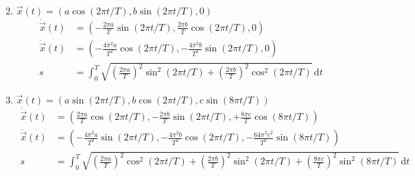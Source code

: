 \documentclass[11pt,answers]{exam}
\begin{document}
\begin{questions}
\begin{solution}
\begin{enumerate}
\begin{align*}
\end{align*}
\item $\vec{x}(t)=(a\cos(2\pi t/T),b\sin(2\pi t/T),0)$
\begin{align*}
\dot{\vec{x}}(t)&=\left(-\frac{2\pi a}{T}\sin(2\pi t/T),
\frac{2\pi b}{T}\cos(2\pi t/T),0\right)
\\
\ddot{\vec{x}}(t)&=\left(-\frac{4\pi^2 a}{T^2}\cos(2\pi t/T),
-\frac{4\pi^2 b}{T^2}\sin(2\pi t/T),0\right)
\\
s&=\int_0^T\sqrt{\left(\frac{2\pi a}{T}\right)^2\sin^2(2\pi t/T)+
\left(\frac{2\pi b}{T}\right)^2\cos^2(2\pi t/T)}\,\mathrm dt
\end{align*}
\item $\vec{x}(t)=(a\sin(2\pi t/T),b\cos(2\pi t/T),c\sin(8\pi t/T))$
\begin{align*}
\dot{\vec{x}}(t)&=\left(\frac{2\pi a}{T}\cos(2\pi t/T),
-\frac{2\pi b}{T}\sin(2\pi t/T),+\frac{8\pi c}{T}\cos(8\pi t/T)\right)
\\
\ddot{\vec{x}}(t)&=\left(-\frac{4\pi^2 a}{T^2}\sin(2\pi t/T),
-\frac{4\pi^2 b}{T^2}\cos(2\pi t/T),-\frac{64\pi^2 c^2}{T^2}\sin(8\pi t/T)\right)
\\
s&=\int_0^T\sqrt{\left(\frac{2\pi a}{T}\right)^2\cos^2(2\pi t/T)+
\left(\frac{2\pi b}{T}\right)^2\sin^2(2\pi t/T)+\left(\frac{8\pi c}{T}\right)^2\sin^2(8\pi t/T)}\,\mathrm dt
\end{align*}


\end{enumerate}
\end{solution}
\end{questions}
\end{document}
